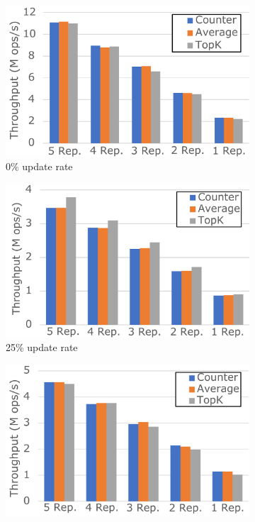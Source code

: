 \documentclass[sigplan,10pt]{acmart}
\begin{document}
\begin{figure}
	\centering
	\begin{subfigure}{.33\linewidth}
		\centering
		\includegraphics[width=.97\linewidth]{CounterAvgTopK0upd_v2_cut}
		\caption{0\% update rate}
		\label{fig:CounterAvgTopK0upd}
	\end{subfigure}%
	\begin{subfigure}{.33\linewidth}
		\centering
		\includegraphics[width=.97\linewidth]{CounterAvgTopK25upd_v2_cut}
		\caption{25\% update rate}
		\label{fig:CounterAvgTopK25upd}
	\end{subfigure}%
	\begin{subfigure}{.33\linewidth}
		\centering
		\includegraphics[width=.97\linewidth]{CounterAvgTopK100upd_v2_cut}

\end{subfigure}
\end{figure}
\end{document}
